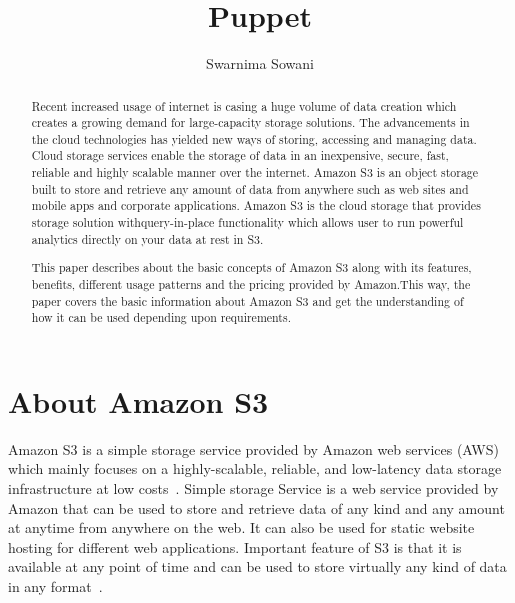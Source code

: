 
\title{Puppet}


\author{Swarnima Sowani}


\renewcommand{\shortauthors}{G. v. Laszewski}

\begin{abstract}

Recent increased usage of internet is casing a huge volume of data creation
which creates a growing demand for large-capacity storage solutions. The
advancements in the cloud technologies has yielded new ways of storing,
accessing and managing data. Cloud storage services enable the storage of data
in an inexpensive, secure, fast, reliable and highly scalable manner over the
internet. Amazon S3 is an object storage built to store and retrieve any amount
of data from anywhere such as web sites and mobile apps and corporate
applications. Amazon S3 is the cloud storage that provides storage solution
withquery-in-place functionality which allows user to run powerful analytics
directly on your data at rest in S3.

This paper describes about the basic concepts of Amazon S3 along with its
features, benefits, different usage patterns and the pricing provided by
Amazon.This way, the paper covers the basic information about Amazon S3 and get
the
understanding of how it can be used depending upon requirements.
\end{abstract}


\maketitle

\section{About Amazon S3}

Amazon S3 is a simple storage service provided by Amazon web services (AWS)
which mainly focuses on a highly-scalable, reliable, and low-latency data
storage infrastructure at low costs~\cite{hid-sp18-420-amazon-S3-FAQ}. Simple
storage Service is a web service provided by Amazon that can be used to store
and retrieve data of any kind and any amount at anytime from anywhere on the
web. It can also be used for static website hosting for different web
applications. Important feature of S3 is that it is available at any point of
time and can be used to store virtually any kind of data in any
format~\cite{hid-sp18-420-amazon-S3-FAQ}.

